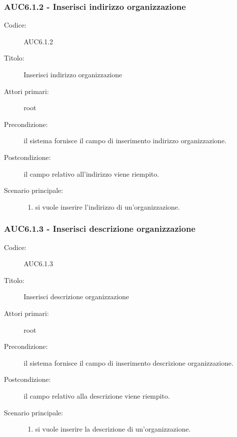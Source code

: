 \documentclass[casi-duso]{subfiles}
\begin{document}
  \subsubsection{AUC6.1.2 - Inserisci indirizzo organizzazione}%
  \label{subsub:AUC6.1.2}
  \begin{description}
    \item[Codice:] AUC6.1.2
    \item[Titolo:] Inserisci indirizzo organizzazione
    \item[Attori primari:] root
    \item[Precondizione:] il sistema fornisce il campo di inserimento indirizzo organizzazione.
    \item[Postcondizione:] il campo relativo all'indirizzo viene riempito.
    \item[Scenario principale:]
    \begin{enumerate}
      \item si vuole inserire l'indirizzo di un'organizzazione.
    \end{enumerate}
  \end{description}

  \subsubsection{AUC6.1.3 - Inserisci descrizione organizzazione}%
  \label{subsub:AUC6.1.3}
  \begin{description}
    \item[Codice:] AUC6.1.3
    \item[Titolo:] Inserisci descrizione organizzazione
    \item[Attori primari:] root
    \item[Precondizione:] il sistema fornisce il campo di inserimento descrizione organizzazione.
    \item[Postcondizione:] il campo relativo alla descrizione viene riempito.
    \item[Scenario principale:]
    \begin{enumerate}
      \item si vuole inserire la descrizione di un'organizzazione.
    \end{enumerate}
  \end{description}
\end{document}
